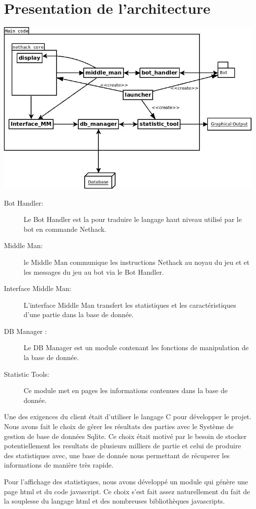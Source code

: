 \section{Presentation de l'architecture}

\includegraphics[width=140mm]{Images/new_archi.jpeg}

\begin{description}
\item[Bot Handler: ] Le Bot Handler est la pour traduire le langage haut niveau utilisé par le bot en commande Nethack.
\item[Middle Man: ] le Middle Man communique les instructions Nethack au noyau du jeu et et les messages du jeu au bot via le Bot Handler.
\item[Interface Middle Man: ] L'interface Middle Man transfert les statistiques et les caractéristiques d'une partie dans la base de donnée.
\item[DB Manager :] Le DB Manager est un module contenant les fonctions de manipulation de la base de donnée.
\item[Statistic Tools:] Ce module met en pages les informations contenues dans la base de donnée.  
\end{description}

Une des exigences du client était d'utiliser le langage C pour développer le projet. Nous avons fait le choix de gérer les résultats des parties avec le Système de gestion de base de données Sqlite. Ce choix était motivé par le besoin de stocker potentiellement les resultats de plusieurs milliers de partie et celui de produire des statistiques avec, une base de donnée nous permettant de récuperer les informations de manière très rapide.

Pour l'affichage des statistiques, nous avons développé un module qui génère une page html et du code javascript. Ce choix s'est fait assez naturellement du fait de la souplesse du langage html et des nombreuses bibliothèques javascripts. 
